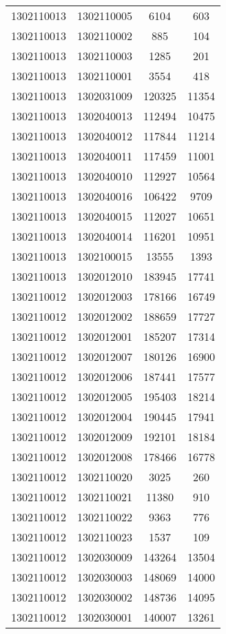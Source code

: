 \begin{longtable}[h]{llcc}
		1302110013 & 1302110005 & 6104 & 603\\
		1302110013 & 1302110002 & 885 & 104\\
		1302110013 & 1302110003 & 1285 & 201\\
		1302110013 & 1302110001 & 3554 & 418\\
		1302110013 & 1302031009 & 120325 & 11354\\
		1302110013 & 1302040013 & 112494 & 10475\\
		1302110013 & 1302040012 & 117844 & 11214\\
		1302110013 & 1302040011 & 117459 & 11001\\
		1302110013 & 1302040010 & 112927 & 10564\\
		1302110013 & 1302040016 & 106422 & 9709\\
		1302110013 & 1302040015 & 112027 & 10651\\
		1302110013 & 1302040014 & 116201 & 10951\\
		1302110013 & 1302100015 & 13555 & 1393\\
		1302110013 & 1302012010 & 183945 & 17741\\
		1302110012 & 1302012003 & 178166 & 16749\\
		1302110012 & 1302012002 & 188659 & 17727\\
		1302110012 & 1302012001 & 185207 & 17314\\
		1302110012 & 1302012007 & 180126 & 16900\\
		1302110012 & 1302012006 & 187441 & 17577\\
		1302110012 & 1302012005 & 195403 & 18214\\
		1302110012 & 1302012004 & 190445 & 17941\\
		1302110012 & 1302012009 & 192101 & 18184\\
		1302110012 & 1302012008 & 178466 & 16778\\
		1302110012 & 1302110020 & 3025 & 260\\
		1302110012 & 1302110021 & 11380 & 910\\
		1302110012 & 1302110022 & 9363 & 776\\
		1302110012 & 1302110023 & 1537 & 109\\
		1302110012 & 1302030009 & 143264 & 13504\\
		1302110012 & 1302030003 & 148069 & 14000\\
		1302110012 & 1302030002 & 148736 & 14095\\
		1302110012 & 1302030001 & 140007 & 13261\\

\end{longtable}
